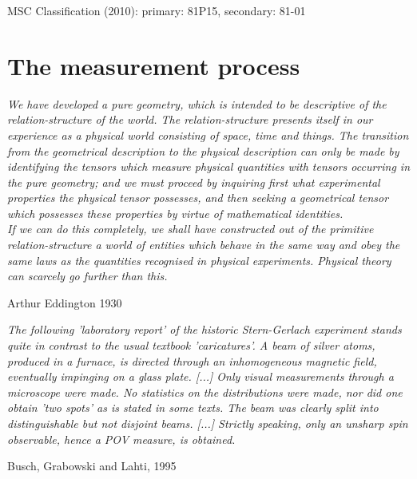 \documentclass[12pt]{article}
\begin{document}
\vfill
MSC Classification (2010): primary: 81P15, secondary: 81-01

\newpage
\tableofcontents %

\newpage
\section{The measurement process}\label{s.measP}

\nopagebreak
\hfill\parbox[t]{10.8cm}{\footnotesize

{\em We have developed a pure geometry, which is intended to be
descriptive of the relation-structure of the world. The
relation-structure presents itself in our experience as a physical world
consisting of space, time and things. The transition from the
geometrical description to the physical description can only be made by
identifying the tensors which measure physical quantities with tensors
occurring in the pure geometry; and we must proceed by inquiring first
what experimental properties the physical tensor possesses, and then
seeking a geometrical tensor which possesses these properties by virtue
of mathematical identities. \\
If we can do this completely, we shall have constructed out of the
primitive relation-structure a world of entities which behave in the
same way and obey the same laws as the quantities recognised in physical
experiments. Physical theory can scarcely go further than this.}

\hfill Arthur Eddington 1930 \cite[p.222]{Edd}
}

\bigskip


\nopagebreak
\hfill\parbox[t]{10.8cm}{\footnotesize

{\em The following 'laboratory report' of the historic Stern-Gerlach
experiment stands quite in contrast to the usual textbook 'caricatures'.
A beam of silver atoms, produced in a furnace, is directed through an
inhomogeneous magnetic field, eventually impinging on a glass plate.
[...]
Only visual measurements through a microscope were made. No statistics
on the distributions were made, nor did one obtain 'two spots' as is
stated in some texts. The beam was clearly split into distinguishable
but not disjoint beams. [...]
Strictly speaking, only an unsharp spin observable, hence a POV measure,
is obtained.}

\hfill Busch, Grabowski and Lahti, 1995 \cite[Example 1, p.7]{BusGL}
}
\end{document}
